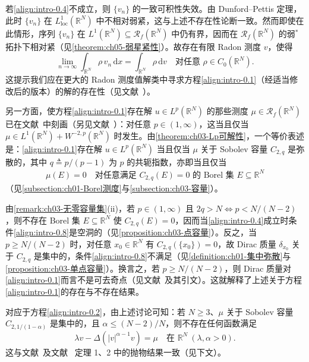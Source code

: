 \documentclass[../main.tex]{subfiles}
\begin{document}
若\eqref{align:intro-0.4}不成立，则 $\{v_n\}$ 的一致可积性失效。由 Dunford--Pettis 定理，此时 $\{v_n\}$ 在 $L^1_{\mathrm{loc}}(\mathbb{R}^N)$ 中不相对弱紧，这与上述不存在性论断一致。然而即使在此情形，序列 $\{v_n\}$ 在 $L^1(\mathbb{R}^N)\subseteq\mathscr{R}_f(\mathbb{R}^N)$ 中仍有界，因而在 $\mathscr{R}_f(\mathbb{R}^N)$ 的弱$^*$拓扑下相对紧（见\cref{theorem:ch05-弱星紧性}）。故存在有限 Radon 测度 $v$，使得
\[
\lim_{n\to\infty}\int_{\mathbb{R}^N}\rho\,v_n\,\mathrm{d}x
= \int_{\mathbb{R}^N}\rho\,\mathrm{d}v
\quad \text{对任意 }\rho\in C_0(\mathbb{R}^N).
\]
这提示我们应在更大的 Radon 测度值解类中寻求方程\eqref{align:intro-0.1}（经适当修改后的版本）的解的存在性（见文献~\cite{ref97}）。

另一方面，使方程\eqref{align:intro-0.1}存在解 $u\in L^p(\mathbb{R}^N)$ 的那些测度 $\mu\in\mathscr{R}_f(\mathbb{R}^N)$ 已在文献~\cite{ref10}中刻画（另见文献~\cite{ref52}）：对任意 $p\in(1,\infty)$，这当且仅当 $\mu\in L^1(\mathbb{R}^N)+W^{-2,p}(\mathbb{R}^N)$ 时发生。由\cref{theorem:ch03-Lp可解性}，一个等价表述是：\eqref{align:intro-0.1}存在解 $u\in L^p(\mathbb{R}^N)$ 当且仅当 $\mu$ 关于 Sobolev 容量 $C_{2,q}$ 是弥散的，其中 $q\triangleq p/(p-1)$ 为 $p$ 的共轭指数，亦即当且仅当
\begin{align}
\mu(E)=0 \quad \text{对任意满足 } C_{2,q}(E)=0 \text{ 的 Borel 集 }E\subseteq\mathbb{R}^N \label{align:intro-0.8}
\end{align}
（见\cref{subsection:ch01-Borel测度}与\cref{subsection:ch03-容量}）。

由\cref{remark:ch03-无零容量集}(ii)，若 $p\in(1,\infty)$ 且 $2q>N\Leftrightarrow p<N/(N-2)$，则不存在 Borel 集 $E\subseteq\mathbb{R}^N$ 使 $C_{2,q}(E)=0$，因而当\eqref{align:intro-0.4}成立时条件\eqref{align:intro-0.8}是空洞的（见\cref{proposition:ch03-点容量}）。反之，当 $p\geqslant N/(N-2)$ 时，对任意 $x_0\in\mathbb{R}^N$ 有 $C_{2,q}(\{x_0\})=0$，故 Dirac 质量 $\delta_{x_0}$ 关于 $C_{2,q}$ 是集中的，条件\eqref{align:intro-0.8}不满足（见\cref{definition:ch01-集中弥散}与\cref{proposition:ch03-单点容量}）。换言之，若 $p\geqslant N/(N-2)$，则 Dirac 质量对\eqref{align:intro-0.1}而言不是可去奇点（见文献~\cite{ref105}及其引文）。这就解释了上述关于方程\eqref{align:intro-0.1}的存在与不存在结果。

\begin{remark}\label{remark:intro-0.1.1}
对应于方程\eqref{align:intro-0.2}，由上述讨论可知：若 $N\geqslant 3$、$\mu$ 关于 Sobolev 容量 $C_{2,1/(1-\alpha)}$ 是集中的，且 $\alpha\leqslant (N-2)/N$，则不存在任何函数满足
\[
\lambda v - \Delta(|v|^{\alpha-1}v) = \mu \quad \text{在 }\mathbb{R}^N\ (\lambda,\alpha>0).
\]
这与文献~\cite{ref26}及文献~\cite{ref80} 定理 1、2 中的抛物结果一致（见下文）。
\end{remark}
\end{document}
